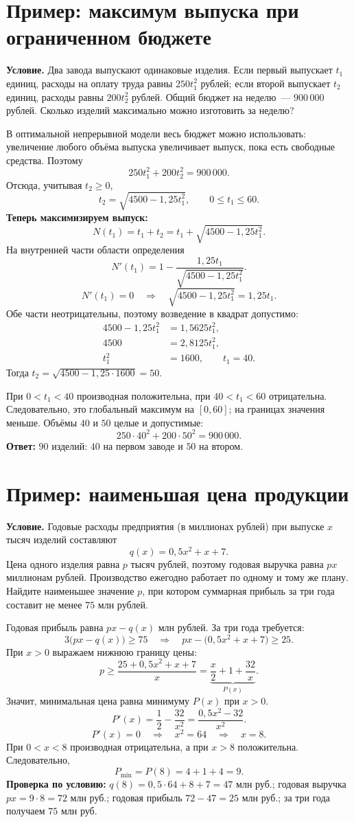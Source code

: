 \documentclass[a4paper,12pt]{article}
\begin{document}
\section{Пример: максимум выпуска при ограниченном бюджете}
\textbf{Условие.} Два завода выпускают одинаковые изделия. Если первый выпускает $t_1$ единиц, расходы на оплату труда равны $250t_1^2$ рублей; если второй выпускает $t_2$ единиц, расходы равны $200t_2^2$ рублей. Общий бюджет на неделю~--- $900\,000$ рублей. Сколько изделий максимально можно изготовить за неделю?

В оптимальной непрерывной модели весь бюджет можно использовать: увеличение любого объёма выпуска увеличивает выпуск, пока есть свободные средства. Поэтому
\[
250t_1^2+200t_2^2=900\,000.
\]
Отсюда, учитывая $t_2\ge0$,
\[
t_2=\sqrt{4500-1{,}25t_1^2},\qquad 0\le t_1\le60.
\]
\textbf{Теперь максимизируем выпуск:}
\[
N(t_1)=t_1+t_2=t_1+\sqrt{4500-1{,}25t_1^2}.
\]
На внутренней части области определения
\[
N'(t_1)=1-\frac{1{,}25t_1}{\sqrt{4500-1{,}25t_1^2}}.
\]
\[
N'(t_1)=0\quad\Rightarrow\quad
\sqrt{4500-1{,}25t_1^2}=1{,}25t_1.
\]
Обе части неотрицательны, поэтому возведение в квадрат допустимо:
\begin{align*}
4500-1{,}25t_1^2&=1{,}5625t_1^2,\\
4500&=2{,}8125t_1^2,\\
t_1^2&=1600,\qquad t_1=40.
\end{align*}
Тогда $t_2=\sqrt{4500-1{,}25\cdot1600}=50$.

При $0<t_1<40$ производная положительна, при $40<t_1<60$ отрицательна. Следовательно, это глобальный максимум на $[0,60]$; на границах значения меньше. Объёмы $40$ и $50$ целые и допустимые:
\[
250\cdot40^2+200\cdot50^2=900\,000.
\]
\textcolor{darkaccent}{\textbf{Ответ:}} $90$ изделий: $40$ на первом заводе и $50$ на втором.


\section{Пример: наименьшая цена продукции}
\textbf{Условие.} Годовые расходы предприятия (в миллионах рублей) при выпуске $x$ тысяч изделий составляют
\[
q(x)=0{,}5x^2+x+7.
\]
Цена одного изделия равна $p$ тысяч рублей, поэтому годовая выручка равна $px$ миллионам рублей. Производство ежегодно работает по одному и тому же плану. Найдите наименьшее значение $p$, при котором суммарная прибыль за три года составит не менее $75$ млн рублей.

Годовая прибыль равна $px-q(x)$ млн рублей. За три года требуется:
\[
3\bigl(px-q(x)\bigr)\ge75\quad\Rightarrow\quad
px-\bigl(0{,}5x^2+x+7\bigr)\ge25.
\]
При $x>0$ выражаем нижнюю границу цены:
\[
p\ge\frac{25+0{,}5x^2+x+7}{x}
=\underbrace{\frac{x}{2}+1+\frac{32}{x}}_{\displaystyle P(x)}.
\]
Значит, минимальная цена равна минимуму $P(x)$ при $x>0$.
\[
P'(x)=\frac12-\frac{32}{x^2}
=\frac{0{,}5x^2-32}{x^2}.
\]
\[
P'(x)=0\quad\Rightarrow\quad x^2=64\quad\Rightarrow\quad x=8.
\]
При $0<x<8$ производная отрицательна, а при $x>8$ положительна. Следовательно,
\[
P_{\min}=P(8)=4+1+4=9.
\]
\textbf{Проверка по условию:} $q(8)=0{,}5\cdot64+8+7=47$ млн руб.; годовая выручка $px=9\cdot8=72$ млн руб.; годовая прибыль $72-47=25$ млн руб.; за три года получаем $75$ млн руб.
\end{document}
